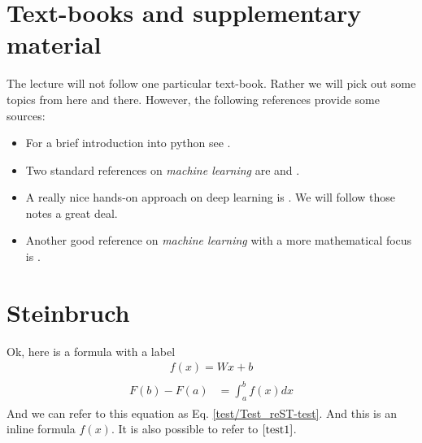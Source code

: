 \documentclass[letterpaper,10pt,english]{sphinxmanual}
\begin{document}
\chapter{Text-books and supplementary material}
\label{supplementary::doc}\label{supplementary:text-books-and-supplementary-material}
The lecture will not follow one particular text-book. Rather we will pick out
some topics from here and there. However, the following references provide some
sources:
\begin{itemize}
\item {} 
For a brief introduction into python see \label{supplementary:id1}{\hyperref[supplementary:gael\string-scipy\string-2016]{\sphinxcrossref{{[}GGV16{]}}}}.

\item {} 
Two standard references on \emph{machine learning} are
\label{supplementary:id2}{\hyperref[supplementary:bishop\string-pattern\string-2007]{\sphinxcrossref{{[}Bis07{]}}}} and \label{supplementary:id3}{\hyperref[supplementary:russell\string-artificial\string-2010]{\sphinxcrossref{{[}RN10{]}}}}.

\item {} 
A really nice hands-on approach on deep learning is
\label{supplementary:id4}{\hyperref[supplementary:nielsen\string-neural\string-2015]{\sphinxcrossref{{[}Nie15{]}}}}.  We will follow those notes a great deal.

\item {} 
Another good reference on \emph{machine learning} with a more mathematical focus is
\label{supplementary:id5}{\hyperref[supplementary:mohri\string-foundations\string-2012]{\sphinxcrossref{{[}Moh12{]}}}}.

\end{itemize}




\chapter{Steinbruch}
\label{test/Test_reST::doc}\label{test/Test_reST:steinbruch}
Ok, here is a formula with a label
\label{test/Test_reST:equation-test}\begin{equation}\label{test/Test_reST-test}
\begin{split}f(x) = W x + b\end{split}
\end{equation}\begin{equation*}
\begin{split}\begin{align}
    F(b) - F(a) &= \int_a^b f(x) dx
    \label{test1}
\end{align}\end{split}
\end{equation*}
And we can refer to this equation as Eq. \eqref{test/Test_reST-test}. And this is an inline formula \(f(x)\). It is also possible to refer to \(\eqref{test1}\).
\end{document}
